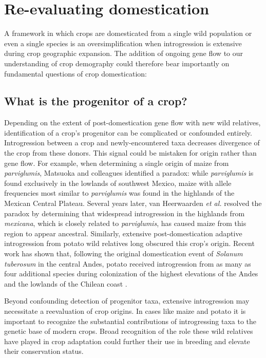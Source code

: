 \documentclass[11pt]{article}
\begin{document}
\section*{Re-evaluating domestication}

A framework in which crops are domesticated from a single wild population or even a single species is an oversimplification when introgression is extensive during crop geographic expansion.
The addition of ongoing gene flow to our understanding of crop demography could therefore bear importantly on fundamental questions of crop domestication:

\subsection*{What is the progenitor of a crop?}
Depending on the extent of post-domestication gene flow with new wild relatives, identification of a crop's progenitor can be complicated or confounded entirely.
Introgression between a crop and newly-encountered taxa decreases divergence of the crop from these donors.
This signal could be mistaken for origin rather than gene flow.
For example, when determining a single origin of maize from \emph{parviglumis}, Matsuoka and colleagues \cite{matsuoka2002single} identified a paradox: while \emph{parviglumis} is found exclusively in the lowlands of southwest Mexico, maize with allele frequencies most similar to \emph{parviglumis} was found in the highlands of the Mexican Central Plateau.
Several years later, van Heerwaarden \emph{et al.} \cite{vanHeerwaarden2011} resolved the paradox by determining that widespread introgression in the highlands from \emph{mexicana}, which is closely related to \emph{parviglumis}, has caused maize from this region to appear ancestral.
Similarly, extensive post-domestication adaptive introgression from  potato wild relatives long obscured this crop's origin.
Recent work has shown that, following the original domestication event of \emph{Solanum tuberosum} in the central Andes, potato received introgression from as many as four additional species during colonization of the highest elevations of the Andes and the lowlands of the Chilean coast \cite{Spooner2014, Gavrilenko2013, Hardigan2017}.

Beyond confounding detection of progenitor taxa, extensive introgression may necessitate a reevaluation of crop origins.
In cases like maize and potato it is important to recognize the substantial contributions of introgressing taxa to the genetic base of modern crops.
Broad recognition of the role these wild relatives have played in crop adaptation could further their use in breeding and elevate their conservation status.
\end{document}
